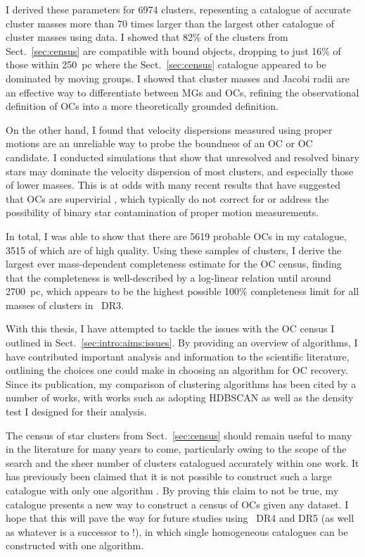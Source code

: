 I derived these parameters for 6974 clusters, repesenting a catalogue of accurate cluster masses more than 70 times larger than the largest other catalogue of cluster masses using \gaia data. I showed that 82\% of the clusters from Sect.~\ref{sec:census} are compatible with bound objects, dropping to just 16\% of those within 250~pc where the Sect.~\ref{sec:census} catalogue appeared to be dominated by moving groups. I showed that cluster masses and Jacobi radii are an effective way to differentiate between MGs and OCs, refining the observational definition of OCs into a more theoretically grounded definition.

On the other hand, I found that velocity dispersions measured using proper motions are an unreliable way to probe the boundness of an OC or OC candidate. I conducted simulations that show that unresolved and resolved binary stars may dominate the velocity dispersion of most clusters, and especially those of lower masses. This is at odds with many recent results that have suggested that OCs are supervirial \citep[e.g.][]{bravi_gaia-eso_2018,kuhn_kinematics_2019,pang_3d_2021}, which typically do not correct for or address the possibility of binary star contamination of proper motion measurements.

In total, I was able to show that there are 5619 probable OCs in my catalogue, 3515 of which are of high quality. Using these samples of clusters, I derive the largest ever mass-dependent completeness estimate for the OC census, finding that the completeness is well-described by a log-linear relation until around 2700~pc, which appears to be the highest possible 100\% completeness limit for all masses of clusters in \gaia\ DR3.

With this thesis, I have attempted to tackle the issues with the OC census I outlined in Sect.~\ref{sec:intro:aims:issues}. By providing an overview of algorithms, I have contributed important analysis and information to the scientific literature, outlining the choices one could make in choosing an algorithm for OC recovery. Since its publication, my comparison of clustering algorithms has been cited by a number of works, with works such as \cite{dellacroce_ongoing_hierarchical_2023a} adopting HDBSCAN as well as the density test I designed for their analysis.

The census of star clusters from Sect.~\ref{sec:census} should remain useful to many in the literature for many years to come, particularly owing to the scope of the search and the sheer number of clusters catalogued accurately within one work. It has previously been claimed that it is not possible to construct such a large catalogue with only one algorithm \citep{cantat-gaudin_clusters_2020}. By proving this claim to not be true, my catalogue presents a new way to construct a census of OCs given any dataset. I hope that this will pave the way for future studies using \gaia\ DR4 and DR5 (as well as whatever is a successor to \gaia!), in which single homogeneous catalogues can be constructed with one algorithm.


